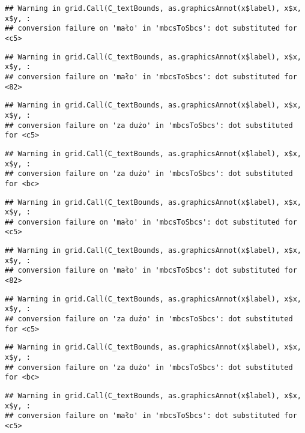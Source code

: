 \documentclass[
]{book}
\begin{document}
\begin{verbatim}
## Warning in grid.Call(C_textBounds, as.graphicsAnnot(x$label), x$x, x$y, :
## conversion failure on 'mało' in 'mbcsToSbcs': dot substituted for <c5>
\end{verbatim}

\begin{verbatim}
## Warning in grid.Call(C_textBounds, as.graphicsAnnot(x$label), x$x, x$y, :
## conversion failure on 'mało' in 'mbcsToSbcs': dot substituted for <82>
\end{verbatim}

\begin{verbatim}
## Warning in grid.Call(C_textBounds, as.graphicsAnnot(x$label), x$x, x$y, :
## conversion failure on 'za dużo' in 'mbcsToSbcs': dot substituted for <c5>
\end{verbatim}

\begin{verbatim}
## Warning in grid.Call(C_textBounds, as.graphicsAnnot(x$label), x$x, x$y, :
## conversion failure on 'za dużo' in 'mbcsToSbcs': dot substituted for <bc>
\end{verbatim}

\begin{verbatim}
## Warning in grid.Call(C_textBounds, as.graphicsAnnot(x$label), x$x, x$y, :
## conversion failure on 'mało' in 'mbcsToSbcs': dot substituted for <c5>
\end{verbatim}

\begin{verbatim}
## Warning in grid.Call(C_textBounds, as.graphicsAnnot(x$label), x$x, x$y, :
## conversion failure on 'mało' in 'mbcsToSbcs': dot substituted for <82>
\end{verbatim}

\begin{verbatim}
## Warning in grid.Call(C_textBounds, as.graphicsAnnot(x$label), x$x, x$y, :
## conversion failure on 'za dużo' in 'mbcsToSbcs': dot substituted for <c5>
\end{verbatim}

\begin{verbatim}
## Warning in grid.Call(C_textBounds, as.graphicsAnnot(x$label), x$x, x$y, :
## conversion failure on 'za dużo' in 'mbcsToSbcs': dot substituted for <bc>
\end{verbatim}

\begin{verbatim}
## Warning in grid.Call(C_textBounds, as.graphicsAnnot(x$label), x$x, x$y, :
## conversion failure on 'mało' in 'mbcsToSbcs': dot substituted for <c5>
\end{verbatim}
\end{document}
